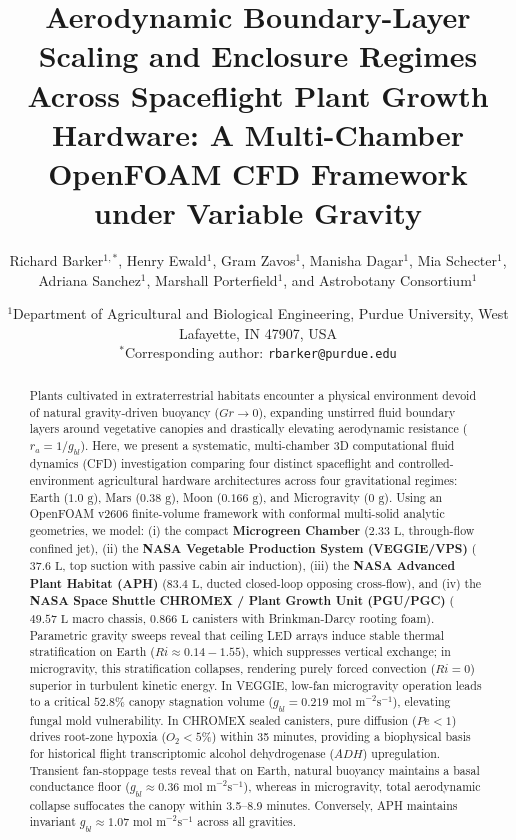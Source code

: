 \documentclass[12pt,a4paper]{article}
\title{\textbf{Aerodynamic Boundary-Layer Scaling and Enclosure Regimes Across Spaceflight Plant Growth Hardware: A Multi-Chamber OpenFOAM CFD Framework under Variable Gravity}}
\author{Richard Barker$^{1,*}$, Henry Ewald$^{1}$, Gram Zavos$^{1}$, Manisha Dagar$^{1}$, Mia Schecter$^{1}$, Adriana Sanchez$^{1}$, Marshall Porterfield$^{1}$, and Astrobotany Consortium$^{1}$}
\date{
\small
$^{1}$Department of Agricultural and Biological Engineering, Purdue University, West Lafayette, IN 47907, USA\\
$^*$Corresponding author: \texttt{rbarker@purdue.edu}
}
\begin{document}
\maketitle

\begin{abstract}
Plants cultivated in extraterrestrial habitats encounter a physical environment devoid of natural gravity-driven buoyancy ($Gr \to 0$), expanding unstirred fluid boundary layers around vegetative canopies and drastically elevating aerodynamic resistance ($r_a = 1/g_{bl}$). Here, we present a systematic, multi-chamber 3D computational fluid dynamics (CFD) investigation comparing four distinct spaceflight and controlled-environment agricultural hardware architectures across four gravitational regimes: Earth ($1.0\text{ g}$), Mars ($0.38\text{ g}$), Moon ($0.166\text{ g}$), and Microgravity ($0\text{ g}$). Using an OpenFOAM v2606 finite-volume framework with conformal multi-solid analytic geometries, we model: (i) the compact \textbf{Microgreen Chamber} ($2.33\text{ L}$, through-flow confined jet), (ii) the \textbf{NASA Vegetable Production System (VEGGIE/VPS)} ($37.6\text{ L}$, top suction with passive cabin air induction), (iii) the \textbf{NASA Advanced Plant Habitat (APH)} ($83.4\text{ L}$, ducted closed-loop opposing cross-flow), and (iv) the \textbf{NASA Space Shuttle CHROMEX / Plant Growth Unit (PGU/PGC)} ($49.57\text{ L}$ macro chassis, $0.866\text{ L}$ canisters with Brinkman-Darcy rooting foam). Parametric gravity sweeps reveal that ceiling LED arrays induce stable thermal stratification on Earth ($Ri \approx 0.14 - 1.55$), which suppresses vertical exchange; in microgravity, this stratification collapses, rendering purely forced convection ($Ri = 0$) superior in turbulent kinetic energy. In VEGGIE, low-fan microgravity operation leads to a critical $52.8\%$ canopy stagnation volume ($g_{bl} = 0.219\text{ mol m}^{-2}\text{s}^{-1}$), elevating fungal mold vulnerability. In CHROMEX sealed canisters, pure diffusion ($Pe < 1$) drives root-zone hypoxia ($O_2 < 5\%$) within 35 minutes, providing a biophysical basis for historical flight transcriptomic alcohol dehydrogenase ($ADH$) upregulation. Transient fan-stoppage tests reveal that on Earth, natural buoyancy maintains a basal conductance floor ($g_{bl} \approx 0.36\text{ mol m}^{-2}\text{s}^{-1}$), whereas in microgravity, total aerodynamic collapse suffocates the canopy within 3.5–8.9 minutes. Conversely, APH maintains invariant $g_{bl} \approx 1.07\text{ mol m}^{-2}\text{s}^{-1}$ across all gravities.
\end{abstract}
\end{document}
